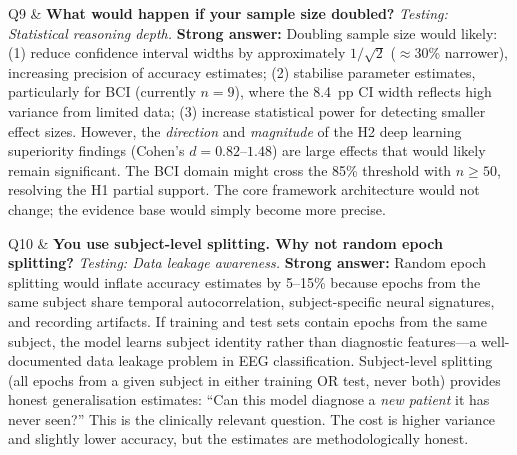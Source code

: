 \begin{xltabular}
Q9 & \textbf{What would happen if your sample size doubled?} \newline
\textit{Testing: Statistical reasoning depth.} \newline\newline
\textbf{Strong answer:} Doubling sample size would likely: (1) reduce confidence interval widths by approximately $1/\sqrt{2}$ ($\approx$30\% narrower), increasing precision of accuracy estimates; (2) stabilise parameter estimates, particularly for BCI (currently $n = 9$), where the 8.4~pp CI width reflects high variance from limited data; (3) increase statistical power for detecting smaller effect sizes. However, the \textit{direction} and \textit{magnitude} of the H2 deep learning superiority findings (Cohen's $d = 0.82$--$1.48$) are large effects that would likely remain significant. The BCI domain might cross the 85\% threshold with $n \geq 50$, resolving the H1 partial support. The core framework architecture would not change; the evidence base would simply become more precise. \\
\addlinespace

Q10 & \textbf{You use subject-level splitting. Why not random epoch splitting?} \newline
\textit{Testing: Data leakage awareness.} \newline\newline
\textbf{Strong answer:} Random epoch splitting would inflate accuracy estimates by 5--15\% because epochs from the same subject share temporal autocorrelation, subject-specific neural signatures, and recording artifacts. If training and test sets contain epochs from the same subject, the model learns subject identity rather than diagnostic features---a well-documented data leakage problem in EEG classification. Subject-level splitting (all epochs from a given subject in either training OR test, never both) provides honest generalisation estimates: ``Can this model diagnose a \textit{new patient} it has never seen?'' This is the clinically relevant question. The cost is higher variance and slightly lower accuracy, but the estimates are methodologically honest. \\
\addlinespace


\end{xltabular}
